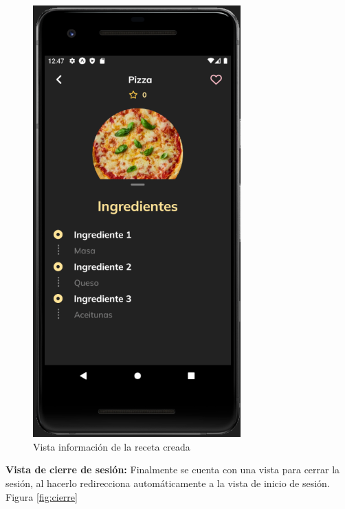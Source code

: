 \begin{figure}[!h]
  \centering
  \includegraphics[width=8cm, scale=1]{Images/Imagenes/add9.png}
  \caption{Vista información de la receta creada}
  \label{fig:add9}
\end{figure}

\textbf{Vista de cierre de sesión: }
Finalmente se cuenta con una vista para cerrar la sesión, al hacerlo redirecciona automáticamente a la vista de inicio de sesión. Figura \ref{fig:cierre}

